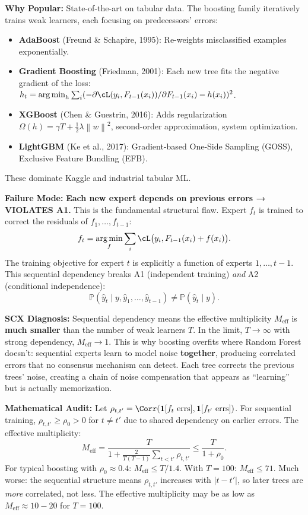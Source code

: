 \documentclass[12pt,a4paper]{article}
\theoremstyle{definition}
\DeclareMathOperator*{\argmin}{arg\,min}
\newcommand{\Pbb}{\mathbb{P}}
\newcommand{\ind}[1]{\mathbf{1}[#1]}
\newcommand{\norm}[1]{\left\lVert#1\right\rVert}
\newcommand{\whyPopular}{\noindent\textbf{Why Popular:} }
\newcommand{\whyFail}{\noindent\textbf{Failure Mode:} }
\newcommand{\diagnosis}{\noindent\textbf{SCX Diagnosis:} }
\newcommand{\mathAudit}{\noindent\textbf{Mathematical Audit:} }
\begin{document}
\whyPopular{} State-of-the-art on tabular data. The boosting family iteratively trains weak learners, each focusing on predecessors' errors:
\begin{itemize}[nosep]
    \item \textbf{AdaBoost} (Freund \& Schapire, 1995): Re-weights misclassified examples exponentially.
    \item \textbf{Gradient Boosting} (Friedman, 2001): Each new tree fits the negative gradient of the loss: $h_t = \argmin_h \sum_i (-\partial \cL(y_i, F_{t-1}(x_i)) / \partial F_{t-1}(x_i) - h(x_i))^2$.
    \item \textbf{XGBoost} (Chen \& Guestrin, 2016): Adds regularization $\Omega(h) = \gamma T + \frac{1}{2}\lambda\norm{w}^2$, second-order approximation, system optimization.
    \item \textbf{LightGBM} (Ke et al., 2017): Gradient-based One-Side Sampling (GOSS), Exclusive Feature Bundling (EFB).
\end{itemize}
These dominate Kaggle and industrial tabular ML.

\whyFail{} \textbf{Each new expert depends on previous errors → VIOLATES A1.} This is the fundamental structural flaw. Expert $f_t$ is trained to correct the residuals of $f_1, \ldots, f_{t-1}$:
\[
f_t = \argmin_f \sum_i \cL\bigl(y_i, F_{t-1}(x_i) + f(x_i)\bigr).
\]
The training objective for expert $t$ is explicitly a function of experts $1, \ldots, t-1$. This sequential dependency breaks A1 (independent training) \textit{and} A2 (conditional independence):
\[
\Pbb(\hat{y}_t \mid y, \hat{y}_1, \ldots, \hat{y}_{t-1}) \neq \Pbb(\hat{y}_t \mid y).
\]

\diagnosis{} Sequential dependency means the effective multiplicity $M_{\text{eff}}$ is \textbf{much smaller} than the number of weak learners $T$. In the limit, $T \to \infty$ with strong dependency, $M_{\text{eff}} \to 1$. This is why boosting overfits where Random Forest doesn't: sequential experts learn to model noise \textbf{together}, producing correlated errors that no consensus mechanism can detect. Each tree corrects the previous trees' noise, creating a chain of noise compensation that appears as ``learning'' but is actually memorization.

\mathAudit{} Let $\rho_{t,t'} = \Corr(\ind{f_t \text{ errs}}, \ind{f_{t'} \text{ errs}})$. For sequential training, $\rho_{t,t'} \ge \rho_0 > 0$ for $t \neq t'$ due to shared dependency on earlier errors. The effective multiplicity:
\[
M_{\text{eff}} = \frac{T}{1 + \frac{2}{T(T-1)}\sum_{t<t'}\rho_{t,t'}} \le \frac{T}{1 + \rho_0}.
\]
For typical boosting with $\rho_0 \approx 0.4$: $M_{\text{eff}} \le T/1.4$. With $T=100$: $M_{\text{eff}} \le 71$. Much worse: the sequential structure means $\rho_{t,t'}$ increases with $|t-t'|$, so later trees are \textit{more} correlated, not less. The effective multiplicity may be as low as $M_{\text{eff}} \approx 10-20$ for $T=100$.
\end{document}
